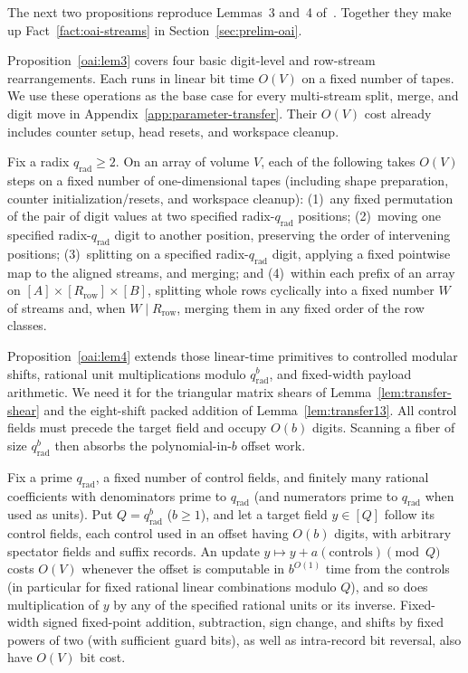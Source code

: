 The next two propositions reproduce Lemmas~3 and~4 of~\cite[\S2.1]{OAI26}. Together they make up Fact~\ref{fact:oai-streams} in Section~\ref{sec:prelim-oai}.

Proposition~\ref{oai:lem3} covers four basic digit-level and row-stream rearrangements. Each runs in linear bit time $O(V)$ on a fixed number of tapes. We use these operations as the base case for every multi-stream split, merge, and digit move in Appendix~\ref{app:parameter-transfer}. Their $O(V)$ cost already includes counter setup, head resets, and workspace cleanup.

\begin{proposition}\label{oai:lem3}
Fix a radix $q_{\mathrm{rad}}\ge2$. On an array of volume $V$, each of the following takes $O(V)$ steps on a fixed
number of one-dimensional tapes (including shape preparation, counter initialization/resets, and workspace cleanup):
(1)~any fixed permutation of the pair of digit values at two specified radix-$q_{\mathrm{rad}}$ positions;
(2)~moving one specified radix-$q_{\mathrm{rad}}$ digit to another position, preserving the order of intervening
positions;
(3)~splitting on a specified radix-$q_{\mathrm{rad}}$ digit, applying a fixed pointwise map to the aligned streams, and
merging; and
(4)~within each prefix of an array on $[A]\times[R_{\mathrm{row}}]\times[B]$, splitting whole rows cyclically into a
fixed number $W$ of streams and, when $W\mid R_{\mathrm{row}}$, merging them in any fixed order of the row classes.
\end{proposition}

Proposition~\ref{oai:lem4} extends those linear-time primitives to controlled modular shifts, rational unit multiplications modulo $q_{\mathrm{rad}}^b$, and fixed-width payload arithmetic. We need it for the triangular matrix shears of Lemma~\ref{lem:transfer-shear} and the eight-shift packed addition of Lemma~\ref{lem:transfer13}. All control fields must precede the target field and occupy $O(b)$ digits. Scanning a fiber of size $q_{\mathrm{rad}}^b$ then absorbs the polynomial-in-$b$ offset work.

\begin{proposition}\label{oai:lem4}
Fix a prime $q_{\mathrm{rad}}$, a fixed number of control fields, and finitely many rational coefficients with
denominators prime to $q_{\mathrm{rad}}$ (and numerators prime to $q_{\mathrm{rad}}$ when used as units). Put
$Q=q_{\mathrm{rad}}^b$ ($b\ge1$), and let a target field $y\in[Q]$ follow its control fields, each control used in an
offset having $O(b)$ digits, with arbitrary spectator fields and suffix records. An update
$y\mapsto y+a(\text{controls})\pmod Q$ costs $O(V)$ whenever the offset is computable in $b^{O(1)}$ time from the
controls (in particular for fixed rational linear combinations modulo $Q$), and so does multiplication of $y$ by any of
the specified rational units or its inverse. Fixed-width signed fixed-point addition, subtraction, sign change, and
shifts by fixed powers of two (with sufficient guard bits), as well as intra-record bit reversal, also have $O(V)$ bit
cost.
\end{proposition}

